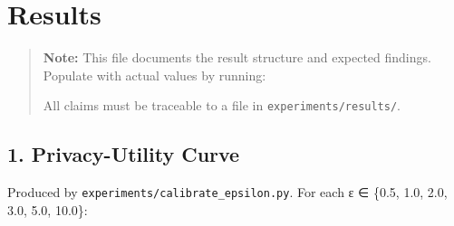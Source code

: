 \section{Results}\label{results}

\begin{quote}
\textbf{Note:} This file documents the result structure and expected
findings. Populate with actual values by running:

\begin{Shaded}
\begin{Highlighting}[]
\end{Highlighting}
\end{Shaded}

All claims must be traceable to a file in \texttt{experiments/results/}.
\end{quote}

\subsection{1. Privacy-Utility Curve}\label{privacy-utility-curve}

Produced by \texttt{experiments/calibrate\_epsilon.py}. For each ε ∈
\{0.5, 1.0, 2.0, 3.0, 5.0, 10.0\}:

